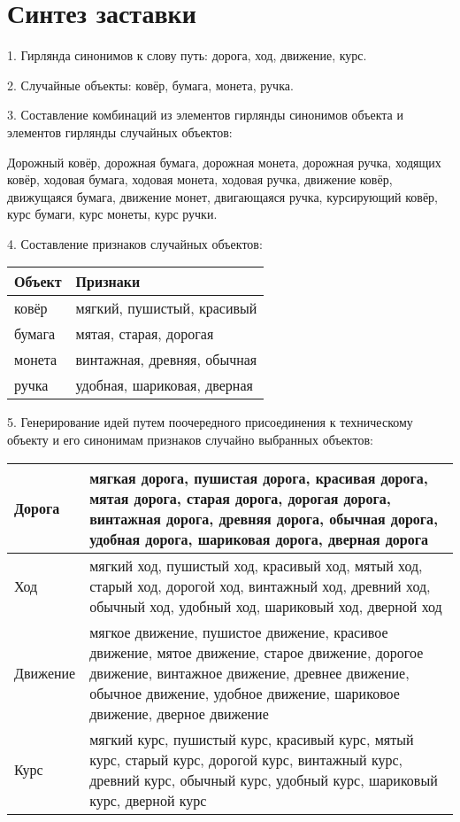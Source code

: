 
\chapter{Синтез заставки}
1. Гирлянда синонимов к слову путь: дорога, ход, движение, курс.

2. Случайные объекты: ковёр, бумага, монета, ручка.

3. Составление комбинаций из элементов гирлянды синонимов объекта и элементов гирлянды случайных объектов:

Дорожный ковёр, дорожная бумага, дорожная монета, дорожная ручка, ходящих ковёр, ходовая бумага, 
ходовая монета, ходовая ручка, движение ковёр, движущаяся бумага, движение монет, двигающаяся ручка, 
курсирующий ковёр, курс бумаги, курс монеты, курс ручки.

4. Составление признаков случайных объектов:
\begin{table}[h!]
    \center
    \begin{tabularx}{\textwidth}{|X|X|}
        \hline
        Объект & Признаки \\ \hline
        ковёр & мягкий, пушистый, красивый \\ \hline
        бумага & мятая, старая, дорогая \\ \hline
        монета & винтажная, древняя, обычная \\ \hline
        ручка & удобная, шариковая, дверная \\ \hline
    \end{tabularx}
\end{table}

5. Генерирование идей путем поочередного присоединения к техническому объекту и его синонимам 
признаков случайно выбранных объектов:
\begin{table}[h!]
    \center
    \begin{tabularx}{\textwidth}{|X|X|}
        \hline
        Дорога & мягкая дорога, пушистая дорога, красивая дорога, мятая дорога, старая дорога, 
            дорогая дорога, винтажная дорога, древняя дорога, обычная дорога, удобная дорога, 
            шариковая дорога, дверная дорога \\ \hline
        Ход & мягкий ход, пушистый ход, красивый ход, мятый ход, старый ход, дорогой ход, 
            винтажный ход, древний ход, обычный ход, удобный ход, шариковый ход, 
            дверной ход \\ \hline
        Движение & мягкое движение, пушистое движение, красивое движение, мятое движение, 
            старое движение, дорогое движение, винтажное движение, древнее движение, 
            обычное движение, удобное движение, шариковое движение, дверное движение \\ \hline
        Курс & мягкий курс, пушистый курс, красивый курс, мятый курс, старый курс, дорогой курс, 
            винтажный курс, древний курс, обычный курс, удобный курс, шариковый курс, 
            дверной курс \\ \hline
    \end{tabularx}
\end{table}

